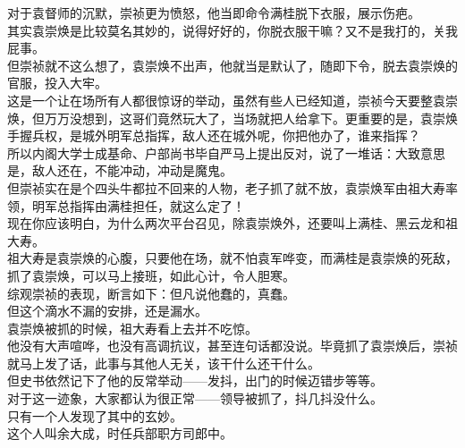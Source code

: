 \begin{multicols}{\theparacolNo}
对于袁督师的沉默，崇祯更为愤怒，他当即命令满桂脱下衣服，展示伤疤。\\

其实袁崇焕是比较莫名其妙的，说得好好的，你脱衣服干嘛？又不是我打的，关我屁事。\\

但崇祯就不这么想了，袁崇焕不出声，他就当是默认了，随即下令，脱去袁崇焕的官服，投入大牢。\\

这是一个让在场所有人都很惊讶的举动，虽然有些人已经知道，崇祯今天要整袁崇焕，但万万没想到，这哥们竟然玩大了，当场就把人给拿下。更重要的是，袁崇焕手握兵权，是城外明军总指挥，敌人还在城外呢，你把他办了，谁来指挥？\\

所以内阁大学士成基命、户部尚书毕自严马上提出反对，说了一堆话：大致意思是，敌人还在，不能冲动，冲动是魔鬼。\\

但崇祯实在是个四头牛都拉不回来的人物，老子抓了就不放，袁崇焕军由祖大寿率领，明军总指挥由满桂担任，就这么定了！\\

现在你应该明白，为什么两次平台召见，除袁崇焕外，还要叫上满桂、黑云龙和祖大寿。\\

祖大寿是袁崇焕的心腹，只要他在场，就不怕袁军哗变，而满桂是袁崇焕的死敌，抓了袁崇焕，可以马上接班，如此心计，令人胆寒。\\

综观崇祯的表现，断言如下：但凡说他蠢的，真蠢。\\

但这个滴水不漏的安排，还是漏水。\\

袁崇焕被抓的时候，祖大寿看上去并不吃惊。\\

他没有大声喧哗，也没有高调抗议，甚至连句话都没说。毕竟抓了袁崇焕后，崇祯就马上发了话，此事与其他人无关，该干什么还干什么。\\

但史书依然记下了他的反常举动——发抖，出门的时候迈错步等等。\\

对于这一迹象，大家都认为很正常——领导被抓了，抖几抖没什么。\\

只有一个人发现了其中的玄妙。\\

这个人叫余大成，时任兵部职方司郎中。\\


\end{multicols}
